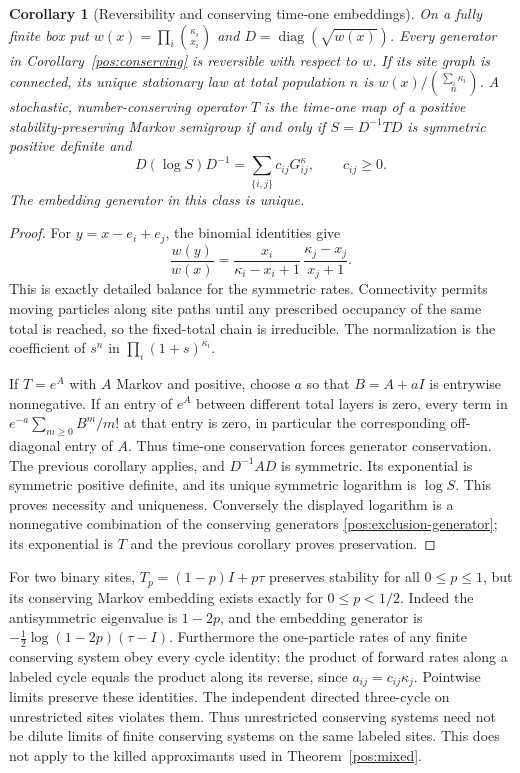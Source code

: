 \documentclass[reqno]{amsart}
\newtheorem{corollary}[theorem]{Corollary}
\theoremstyle{definition}
\theoremstyle{remark}
\DeclareMathOperator{\diag}{diag}
\begin{document}
\begin{corollary}[Reversibility and conserving time-one embeddings]\label{pos:embedding}
On a fully finite box put \(w(x)=\prod_i\binom{\kappa_i}{x_i}\) and
\(D=\diag(\sqrt{w(x)})\).
Every generator in Corollary~\ref{pos:conserving} is reversible with respect to
\(w\).  If its site graph is connected, its unique stationary law at total
population \(n\) is
\(w(x)/\binom{\sum_i\kappa_i}{n}\).
A stochastic, number-conserving operator \(T\) is the time-one map of a positive
stability-preserving Markov semigroup if and only if
\(S=D^{-1}TD\) is symmetric positive definite and
\[
 D(\log S)D^{-1}=\sum_{\{i,j\}}c_{ij}G_{ij}^\kappa,
 \qquad c_{ij}\ge0.
\]
The embedding generator in this class is unique.
\end{corollary}
\begin{proof}
For \(y=x-e_i+e_j\), the binomial identities give
\[
 \frac{w(y)}{w(x)}=
 \frac{x_i}{\kappa_i-x_i+1}\,
 \frac{\kappa_j-x_j}{x_j+1}.
\]
This is exactly detailed balance for the symmetric rates.  Connectivity permits
moving particles along site paths until any prescribed occupancy of the same
total is reached, so the fixed-total chain is irreducible.  The normalization
is the coefficient of \(s^n\) in \(\prod_i(1+s)^{\kappa_i}\).

If \(T=e^A\) with \(A\) Markov and positive, choose \(a\) so that \(B=A+aI\)
is entrywise nonnegative.  If an entry of \(e^A\) between different total layers
is zero, every term in \(e^{-a}\sum_{m\ge0}B^m/m!\) at that entry is zero,
in particular the corresponding off-diagonal entry of \(A\).
Thus time-one conservation forces generator conservation.  The previous
corollary applies, and \(D^{-1}AD\) is symmetric.  Its exponential is symmetric
positive definite, and its unique symmetric logarithm is \(\log S\).
This proves necessity and uniqueness.  Conversely the displayed logarithm is
a nonnegative combination of the conserving generators
\eqref{pos:exclusion-generator}; its exponential is \(T\) and the previous
corollary proves preservation.
\end{proof}

For two binary sites, \(T_p=(1-p)I+p\tau\) preserves stability for all
\(0\le p\le1\), but its conserving Markov embedding exists exactly for
\(0\le p<1/2\).  Indeed the antisymmetric eigenvalue is \(1-2p\), and the
embedding generator is
\(-\tfrac12\log(1-2p)(\tau-I)\).
Furthermore the one-particle rates of any finite conserving system obey every
cycle identity: the product of forward rates along a labeled cycle equals
the product along its reverse, since \(a_{ij}=c_{ij}\kappa_j\).
Pointwise limits preserve these identities.  The independent directed
three-cycle on unrestricted sites violates them.  Thus unrestricted conserving
systems need not be dilute limits of finite conserving systems on the same
labeled sites.  This does not apply to the killed approximants used in
Theorem~\ref{pos:mixed}.
\end{document}
